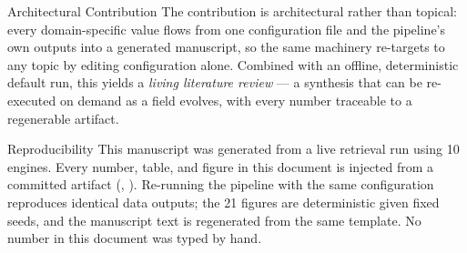 \documentclass[
  ignorenonframetext,
]{beamer}
\begin{document}
\begin{frame}[allowframebreaks]{Architectural Contribution}
\protect{}\label{architectural-contribution}
The contribution is architectural rather than topical: every
domain-specific value flows from one configuration file and the
pipeline's own outputs into a generated manuscript, so the same
machinery re-targets to any topic by editing configuration alone.
Combined with an offline, deterministic default run, this yields a
\emph{living literature review} --- a synthesis that can be re-executed
on demand as a field evolves, with every number traceable to a
regenerable artifact.
\end{frame}

\begin{frame}{Reproducibility}
\protect{}\label{reproducibility}
This manuscript was generated from a live retrieval run using 10
engines. Every number, table, and figure in this document is injected
from a committed artifact (,
). Re-running the pipeline with the same
configuration reproduces identical data outputs; the 21 figures are
deterministic given fixed seeds, and the manuscript text is regenerated
from the same template. No number in this document was typed by hand.
\end{frame}
\end{document}
